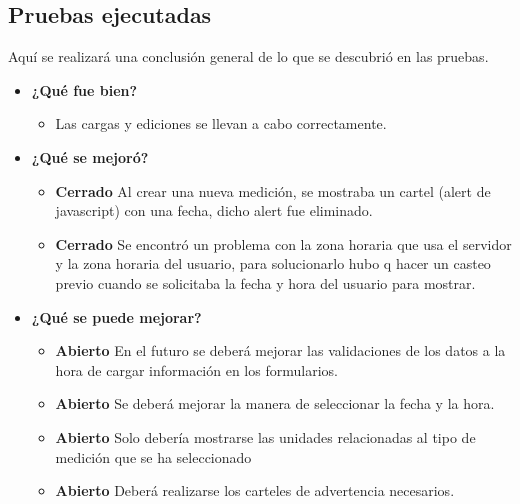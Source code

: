 \subsection{Pruebas ejecutadas}
Aquí se realizará una conclusión general de lo que se descubrió en las pruebas.
	\begin{itemize}
		\item \textbf{¿Qué fue bien?}
        	\begin{itemize}
				\item        Las cargas y ediciones se llevan a cabo correctamente.
			\end{itemize}

   		\item \textbf{¿Qué se mejoró?}
        	\begin{itemize}
				\item \textbf{Cerrado} Al crear una nueva medición, se mostraba un cartel (alert de javascript) con una fecha, dicho alert fue eliminado.
                \item \textbf{Cerrado} Se encontró un problema con la zona horaria que usa el servidor y la zona horaria del usuario, para solucionarlo hubo q hacer un casteo previo cuando se solicitaba la fecha y hora del usuario para mostrar.
			\end{itemize}

   		\item \textbf{¿Qué se puede mejorar?}
        	\begin{itemize}
		        \item \textbf{Abierto} En el futuro se deberá mejorar las validaciones de los datos a la hora de cargar información en los formularios.
        		\item \textbf{Abierto} Se deberá mejorar la manera de seleccionar la fecha y la hora.
		        \item \textbf{Abierto} Solo debería mostrarse las unidades relacionadas al tipo de medición que se ha seleccionado  
                \item \textbf{Abierto} Deberá realizarse los carteles de advertencia necesarios.
            \end{itemize}
        

	\end{itemize}